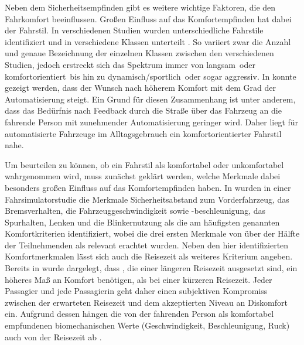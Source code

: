 Neben dem Sicherheitsempfinden gibt es weitere wichtige Faktoren, die den Fahrkomfort beeinflussen. Großen Einfluss auf das Komfortempfinden hat dabei der Fahrstil. In verschiedenen Studien wurden unterschiedliche Fahrstile identifiziert und in verschiedene Klassen unterteilt \cite{Abendroth.2012,Bellem.2016,Murphey.30.03.200902.04.2009}. So variiert zwar die Anzahl und genaue Bezeichnung der einzelnen Klassen zwischen den verschiedenen Studien, jedoch erstreckt sich das Spektrum immer von \glqq langsam\grqq~oder \glqq komfortorientiert\grqq~bis hin zu \glqq dynamisch/sportlich\grqq~oder sogar \glqq aggressiv\grqq. In \cite{Lange.2014} konnte gezeigt werden, dass der Wunsch nach höherem Komfort mit dem Grad der Automatisierung steigt. Ein Grund für diesen Zusammenhang ist unter anderem, dass das Bedürfnis nach Feedback durch die Straße über das Fahrzeug an die fahrende Person mit zunehmender Automatisierung geringer wird. Daher liegt für automatisierte Fahrzeuge im Alltagsgebrauch ein komfortorientierter Fahrstil nahe. 

Um beurteilen zu können, ob ein Fahrstil als komfortabel oder unkomfortabel wahrgenommen wird, muss zunächst geklärt werden, welche Merkmale dabei besonders großen Einfluss auf das Komfortempfinden haben. In \cite{Scherer.2015} wurden in einer Fahrsimulatorstudie die Merkmale Sicherheitsabstand zum Vorderfahrzeug, das Bremsverhalten, die Fahrzeuggeschwindigkeit sowie -beschleunigung, das Spurhalten, Lenken und die Blinkernutzung als die am häufigsten genannten Komfortkriterien identifiziert, wobei die drei ersten Merkmale von über der Hälfte der Teilnehmenden als relevant erachtet wurden. Neben den hier identifizierten Komfortmerkmalen lässt sich auch die Reisezeit als weiteres Kriterium angeben. Bereits in \cite{Oborne.1978} wurde dargelegt, dass , die einer längeren Reisezeit ausgesetzt sind, ein höheres Maß an Komfort benötigen, als bei einer kürzeren Reisezeit. Jeder Passagier und jede Passagierin geht daher einen subjektiven Kompromiss zwischen der erwarteten Reisezeit und dem akzeptierten Niveau an Diskomfort ein. Aufgrund dessen hängen die von der fahrenden Person als komfortabel empfundenen biomechanischen Werte (Geschwindigkeit, Beschleunigung, Ruck) auch von der Reisezeit ab \cite{Festner.2019}.

